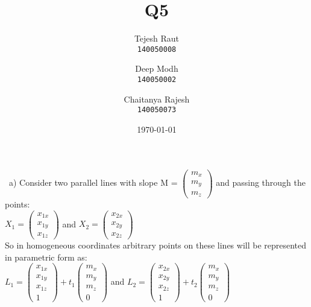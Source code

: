 \documentclass{article}
\title{Q5}
\date{\today}
\author{
	Tejesh Raut\\
	\texttt{140050008}
	\and
	Deep Modh\\
	\texttt{140050002}
	\and
	Chaitanya Rajesh\\
	\texttt{140050073}
	}
\renewcommand{\section}\large{}
\begin{document}
	\maketitle
	\
	\section{\huge{a)}} Consider two parallel lines with slope M = 
	\begin{math}
	\begin{pmatrix}
	m_x \\
	m_y \\
	m_z
	\end{pmatrix}
	\end{math}
	and passing through the points: \\
	\begin{math}X_1=\begin{pmatrix}x_{1x}\\x_{1y}\\x_{1z}\end{pmatrix}\end{math} and \begin{math}X_2 = \begin{pmatrix}x_{2x}\\x_{2y}\\x_{2z}\end{pmatrix}\end{math}
	\\
	So in homogeneous coordinates arbitrary points on these lines will be represented in parametric form as:
	\\
	\begin{math}L_1 = \begin{pmatrix}x_{1x}\\x_{1y}\\x_{1z}\\1\end{pmatrix} + t_1\begin{pmatrix}m_x\\m_y\\m_z\\0\end{pmatrix}\end{math}
	and
	\begin{math}L_2 = \begin{pmatrix}x_{2x}\\x_{2y}\\x_{2z}\\1\end{pmatrix} + t_2\begin{pmatrix}m_x\\m_y\\m_z\\0\end{pmatrix}\end{math}
\end{document}
